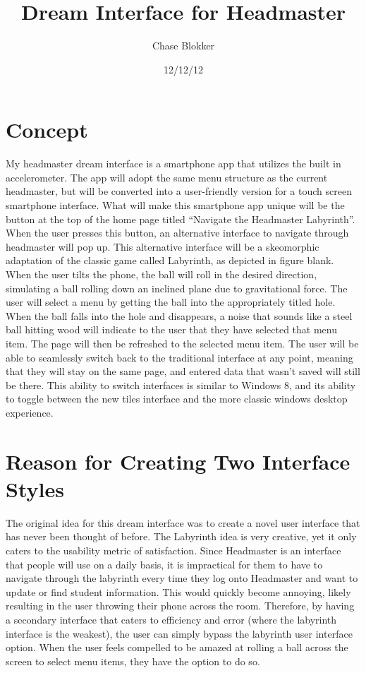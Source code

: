 \documentclass{article}
\title{Dream Interface for Headmaster}
\author{Chase Blokker}
\date{12/12/12}
\begin{document}
\maketitle


\section{Concept}
\label{Concept}

My headmaster dream interface is a smartphone app that utilizes the built in accelerometer.  The app will adopt the same menu structure as the current headmaster, but will be converted into a user-friendly version for a touch screen smartphone interface.   What will make this smartphone app unique will be the button at the top of the home page titled “Navigate the Headmaster Labyrinth”.  When the user presses this button, an alternative interface to navigate through headmaster will pop up.   This alternative interface will be a skeomorphic adaptation of the classic game called Labyrinth, as depicted in figure blank.  When the user tilts the phone, the ball will roll in the desired direction, simulating a ball rolling down an inclined plane due to gravitational force.  The user will select a menu by getting the ball into the appropriately titled hole.  When the ball falls into the hole and disappears, a noise that sounds like a steel ball hitting wood will indicate to the user that they have selected that menu item. The page will then be refreshed to the selected menu item.  The user will be able to seamlessly switch back to the traditional interface at any point, meaning that they will stay on the same page, and entered data that wasn’t saved will still be there.  This ability to switch interfaces is similar to Windows 8, and its ability to toggle between the new tiles interface and the more classic windows desktop experience.


\section{Reason for Creating Two Interface Styles}
\label{Reason for Creating Two Interface Styles}

The original idea for this dream interface was to create a novel user interface that has never been thought of before.  The Labyrinth idea is very creative, yet it only caters to the usability metric of satisfaction.  Since Headmaster is an interface that people will use on a daily basis, it is impractical for them to have to navigate through the labyrinth every time they log onto Headmaster and want to update or find student information.  This would quickly become annoying, likely resulting in the user throwing their phone across the room.  Therefore, by having a secondary interface that caters to efficiency and error (where the labyrinth interface is the weakest), the user can simply bypass the labyrinth user interface option.  When the user feels compelled to be amazed at rolling a ball across the screen to select menu items, they have the option to do so.
\end{document}
